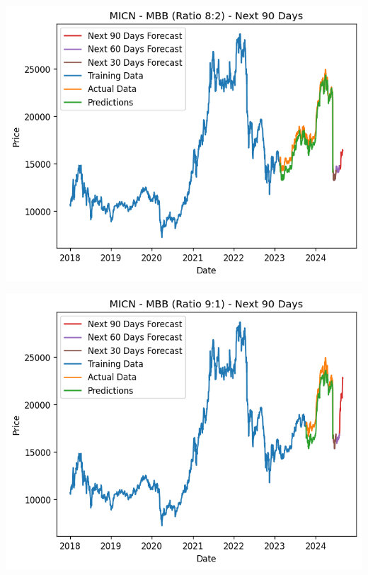 \documentclass[conference]{IEEEtran}
\begin{document}
\begin{minipage}{0.23\textwidth}
    \centering
    \includegraphics[width=\linewidth]{images/MICN/MICN_MBB_82.png}
    \label{fig:image1}
\end{minipage}
\hfill
\begin{minipage}{0.23\textwidth}
    \centering
    \includegraphics[width=\linewidth]{images/MICN/MICN_MBB_91.png}
    \label{fig:image2}
\end{minipage}

\printbibliography
\end{document}
